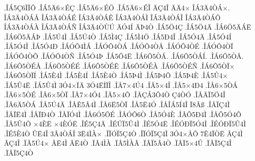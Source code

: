 {.^^ce^^c15^^c76^^cc^^cf^^d4
.^^ce^^c15^^c46^^d7^^c9^^c7
.^^ce^^c15^^c46^^d7^^c9^^d6
.^^ce^^c15^^c46^^d7^^c9^^ce
^^c4^^c74^^ce
^^c4^^c44^^d7
^^ce^^c13^^c44^^d2^^c1^^d7.
^^ce^^c13^^c44^^d2^^c1^^c5
^^ce^^c13^^c44^^d2^^c1^^c9
^^ce^^c13^^c44^^d2^^c1^^ca
^^ce^^c13^^c44^^d2^^c1^^cc
^^ce^^c13^^c44^^d2^^c1^^ce
^^ce^^c13^^c44^^d2^^c1^^d4
^^ce^^c13^^c44^^d2^^c1^^c0
^^ce^^c13^^c44^^d2^^c1^^d1
^^ce^^c13^^c44^^d2^^d9^^da
^^c4^^d34^^cd
^^c4^^de4^^d2
.^^ce^^c15^^d64^^c7
.^^ce^^c15^^d64^^c4
.^^ce^^c16^^d65^^c4^^c1^^cb
.^^ce^^c16^^d65^^c4^^c1^^de
.^^ce^^c15^^da4^^cc
.^^ce^^c15^^da4^^d2
.^^ce^^c15^^cc4^^c7
.^^ce^^c15^^cc4^^d6
.^^ce^^c15^^d04^^ce
.^^ce^^c15^^d34^^c4
.^^ce^^c15^^d34^^cd
.^^ce^^c15^^d34^^ce
.^^ce^^c15^^d34^^d0
.^^ce^^c1^^d3^^d44^^cc^^c1
.^^ce^^c1^^d3^^d44^^d2^^c1
.^^ce^^c1^^d3^^d44^^d2^^c5
.^^ce^^c1^^d3^^d44^^d2^^c9
.^^ce^^c1^^d3^^d44^^d2^^cf
.^^ce^^c1^^d3^^d44^^d2^^d5
.^^ce^^c1^^d3^^d44^^d2^^d1
.^^ce^^c15^^d34^^de
.^^ce^^c15^^d44^^cb
.^^ce^^c16^^d45^^d2^^c1.
.^^ce^^c16^^d45^^d2^^c1^^cd.
.^^ce^^c16^^d45^^d2^^c5.
.^^ce^^c16^^d45^^d2^^c9^^c5
.^^ce^^c16^^d45^^d2^^c9^^c9
.^^ce^^c16^^d45^^d2^^c9^^ca
.^^ce^^c16^^d45^^d2^^c9^^c0
.^^ce^^c16^^d45^^d2^^c9^^d1
.^^ce^^c16^^d45^^d2^^cf^^d7
.^^ce^^c16^^d45^^d2^^cf^^cd
.^^ce^^c15^^c84^^cc
.^^ce^^c15^^c84^^cd
.^^ce^^c15^^c84^^d2
.^^ce^^c15^^de4^^cc
.^^ce^^c15^^de4^^d4
.^^ce^^c15^^de4^^c8
.^^ce^^c15^^db4^^d7
.^^ce^^c15^^db4^^cb
.^^ce^^c15^^db4^^cc
3^^d34^^d7^^cf^^c4
3^^d34^^cb^^cc^^cf^^ce
.^^ce^^c57^^d74^^da4
.^^ce^^c55^^d74^^ce
.^^ce^^c55^^d74^^d04
.^^ce^^c56^^d75^^d2^^c1
.^^ce^^c56^^d75^^d2^^c9
.^^ce^^c56^^d75^^d2^^cf
.^^ce^^c57^^d74^^d34
.^^ce^^c55^^d74^^d4
.^^ce^^c5^^c7^^c13^^d44^^d2
^^c74^^d2^^d3
.^^ce^^c5^^c4^^cf5^^d64^^ce
.^^ce^^c56^^c45^^d2^^c1
.^^ce^^c55^^da4^^c4
.^^ce^^c5^^ca5^^c24^^cc
.^^ce^^c56^^cb5^^d2^^cf
.^^ce^^c55^^cb4^^d3
.^^ce^^c5^^ce^^c15^^cd4^^ce
^^cf8^^c2^^df
.^^ce^^c5^^cf^^c74^^cc
.^^ce^^c5^^cf^^cb4^^cc
.^^ce^^c5^^cf^^d04^^d2
.^^ce^^c5^^cf^^d34^^cc
.^^ce^^c56^^d35^^d4^^c9
.^^ce^^c5^^d3^^d46^^d2
.^^ce^^c55^^d34^^c8
.^^ce^^c5^^d55^^d04^^cc
.^^ce^^c5^^d55^^d34^^d4
.^^ce^^c55^^db4^^d4
^^d74^^c8^^cb
^^d74^^c8^^d3^^cb
.^^ce^^c95^^c74^^c4
.^^ce^^c9^^da^^cf5^^db4^^cc
.^^ce^^c95^^d34^^cb
.^^ce^^c9^^d3^^d0^^cf5^^d34^^cc
.^^ce^^c9^^d3^^d0^^cf5^^db4^^cc
.^^ce^^c95^^c84^^d2
^^db^^cb4^^ce
3^^c24^^d2^^c1^^ce
3^^cb4^^cc^^c0^^d7
.^^ce^^cf^^d3^^cf5^^c74^^d2
.^^ce^^cf^^d3^^cf5^^c74^^cc
3^^d34^^d7^^c5^^d4
7^^ca4^^cf^^d2^^cb
^^c2^^c74^^cc
^^c2^^c74^^ce
.^^cf^^c25^^da4^^d7
^^c2^^cb4^^cc
^^c2^^cb4^^d2
.^^cf^^c24^^cc^^c0
.^^cf^^c25^^cc^^c0^^c2
.^^cf^^c2^^cf5^^c24^^d2
.^^cf^^c2^^cf5^^d74^^db
.^^cf^^c2^^cf5^^c74^^ce
.^^cf^^c2^^cf5^^c74^^d2
}
